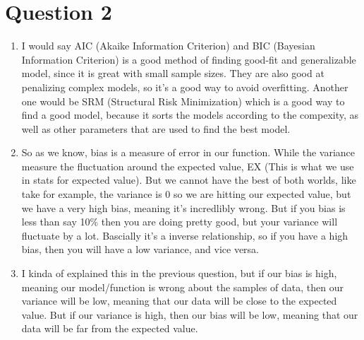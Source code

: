 \documentclass{article}
\begin{document}
\section*{Question 2}
\begin{enumerate}[label=\alph*)]
    \item I would say AIC (Akaike Information Criterion) and BIC (Bayesian Information Criterion) is a good method of finding good-fit and generalizable model, since it is great with small sample sizes.
    They are also good at penalizing complex models, so it's a good way to avoid overfitting. Another one would be SRM (Structural Risk Minimization) which is a good way to find a good model, because it sorts the models according to the compexity, as well as other parameters that are used to find the best model.
    \item So as we know, bias is a measure of error in our function. While the variance measure the fluctuation around the 
    expected value, EX (This is what we use in stats for expected value). But we cannot have the best of both worlds, like take for example, the variance is 0 so we are hitting our expected value, but we have a very high bias, meaning it's incredlibly wrong.
    But if you bias is less than say 10\% then you are doing pretty good, but your variance will fluctuate by a lot. Bascially it's a inverse relationship, so if you have a high bias, then you will have a low variance, and vice versa.
    \item I kinda of explained this in the previous question, but if our bias is high, meaning our model/function is wrong about the samples of data, then our variance will be low, meaning that our data will be close to the expected value. But if our variance is high, then our bias will be low, meaning that our data will be far from the expected value.
\end{enumerate}
\end{document}
